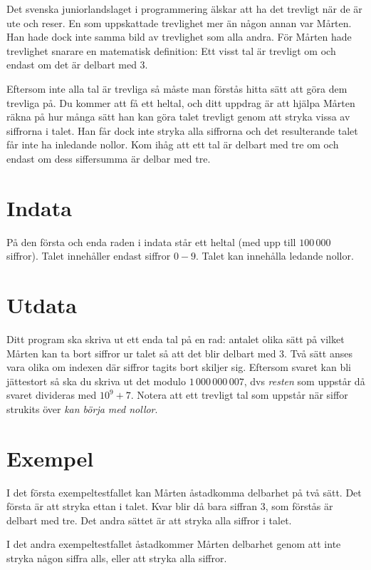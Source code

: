 Det svenska juniorlandslaget i programmering älskar att ha det trevligt när de är ute och reser. En som uppskattade trevlighet mer än någon annan var Mårten. Han hade dock inte samma bild av trevlighet som alla andra. För Mårten hade trevlighet snarare en matematisk definition: Ett visst tal är trevligt om och endast om det är delbart med 3.

Eftersom inte alla tal är trevliga så måste man förstås hitta sätt att göra dem trevliga på. Du kommer att få ett heltal, och ditt uppdrag är att hjälpa Mårten räkna på hur många sätt han kan göra talet trevligt genom att stryka vissa av siffrorna i talet. Han får dock inte stryka alla siffrorna och det resulterande talet får inte ha inledande nollor. Kom ihåg att ett tal är delbart med tre om och endast om dess siffersumma är delbar med tre. 

\section*{Indata}
På den första och enda raden i indata står ett heltal (med upp till $100\,000$ siffror). Talet innehåller endast siffror $0-9$. Talet kan innehålla ledande nollor.

\section*{Utdata}
Ditt program ska skriva ut ett enda tal på en rad: antalet olika sätt på vilket Mårten kan ta bort siffror ur talet så att det blir delbart med 3. Två sätt anses vara olika om indexen där siffror tagits bort skiljer sig. Eftersom svaret kan bli jättestort så ska du skriva ut det modulo $1\,000\,000\,007$, dvs \emph{resten} som uppstår då svaret divideras med $10^9 + 7$. Notera att ett trevligt tal som uppstår när siffor strukits över \emph{kan börja med nollor}.

\section*{Exempel}
I det första exempeltestfallet kan Mårten åstadkomma delbarhet på två sätt. Det första är att stryka ettan i talet. Kvar blir då bara siffran 3, som förstås är delbart med tre. Det andra sättet är att stryka alla siffror i talet.

I det andra exempeltestfallet åstadkommer Mårten delbarhet genom att inte stryka någon siffra alls, eller att stryka alla siffror.

